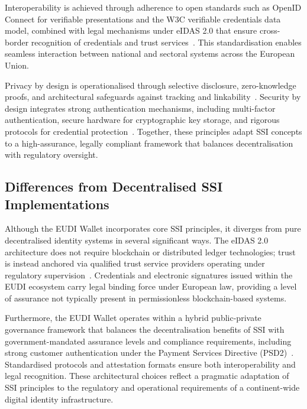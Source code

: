 \documentclass[sigconf,balance,nonacm,authordraft]{acmart}
\begin{document}
Interoperability is achieved through adherence to open standards such as OpenID Connect for verifiable presentations and the W3C verifiable credentials data model, combined with legal mechanisms under eIDAS 2.0 that ensure cross-border recognition of credentials and trust services~\cite{Finextra_SSI_Components}. This standardisation enables seamless interaction between national and sectoral systems across the European Union.

Privacy by design is operationalised through selective disclosure, zero-knowledge proofs, and architectural safeguards against tracking and linkability~\cite{ZKPDiscussion_Article5a,Potential_PrivacyDesign}. Security by design integrates strong authentication mechanisms, including multi-factor authentication, secure hardware for cryptographic key storage, and rigorous protocols for credential protection~\cite{ISC2_GuidingPrinciples,Potential_SecurityDesign}. Together, these principles adapt SSI concepts to a high-assurance, legally compliant framework that balances decentralisation with regulatory oversight.

\subsection{Differences from Decentralised SSI Implementations}

Although the EUDI Wallet incorporates core SSI principles, it diverges from pure decentralised identity systems in several significant ways. The eIDAS 2.0 architecture does not require blockchain or distributed ledger technologies; trust is instead anchored via qualified trust service providers operating under regulatory supervision~\cite{Finextra_SSI_Differences}. Credentials and electronic signatures issued within the EUDI ecosystem carry legal binding force under European law, providing a level of assurance not typically present in permissionless blockchain-based systems.

Furthermore, the EUDI Wallet operates within a hybrid public-private governance framework that balances the decentralisation benefits of SSI with government-mandated assurance levels and compliance requirements, including strong customer authentication under the Payment Services Directive (PSD2)~\cite{Finextra_SSI_Differences}. Standardised protocols and attestation formats ensure both interoperability and legal recognition. These architectural choices reflect a pragmatic adaptation of SSI principles to the regulatory and operational requirements of a continent-wide digital identity infrastructure.
\end{document}
